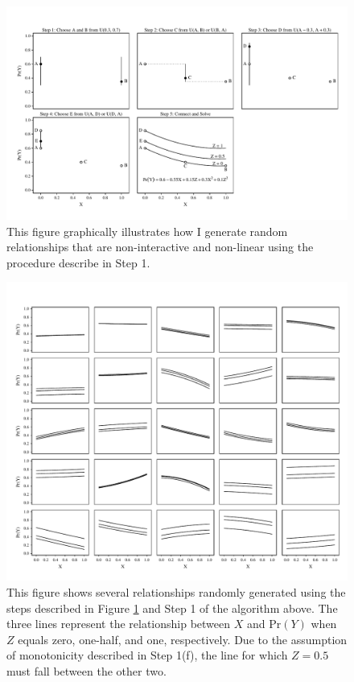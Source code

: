 \documentclass[12pt]{article}
\begin{document}
\begin{appendix}
        \begin{figure}[h]
        \begin{center}
        \includegraphics[width = \linewidth]{fig/fig-choose-relationship.pdf}
        \end{center}\caption{This figure graphically illustrates how I generate random relationships that are non-interactive and non-linear using the procedure describe in Step 1.}\label{fig:choose-relationship}
        \end{figure}
        
 
              \begin{figure}[h]
        \begin{center}
        \includegraphics[width = \linewidth]{fig/fig-relationship-sample.pdf}
        \end{center}\caption{This figure shows several relationships randomly generated using the steps described in Figure \ref{fig:choose-relationship} and Step 1 of the algorithm above. The three lines represent the relationship between $X$ and $\text{Pr}(Y)$ when $Z$ equals zero, one-half, and one, respectively. Due to the assumption of monotonicity described in Step 1(f), the line for which $Z = 0.5$ must fall between the other two.}\label{fig:relationship-sample}
        \end{figure}
        

\end{appendix}
\end{document}
